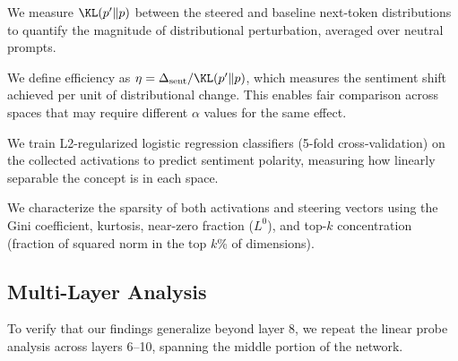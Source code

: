We measure $\KL(p' \| p)$ between the steered and baseline next-token distributions to quantify the magnitude of distributional perturbation, averaged over neutral prompts.

We define efficiency as $\eta = \Delta_{\text{sent}} / \KL(p' \| p)$, which measures the sentiment shift achieved per unit of distributional change. This enables fair comparison across spaces that may require different $\alpha$ values for the same effect.

We train L2-regularized logistic regression classifiers (5-fold cross-validation) on the collected activations to predict sentiment polarity, measuring how linearly separable the concept is in each space.

We characterize the sparsity of both activations and steering vectors using the Gini coefficient, kurtosis, near-zero fraction ($L^0$), and top-$k$ concentration (fraction of squared norm in the top $k$\% of dimensions).

\subsection{Multi-Layer Analysis}

To verify that our findings generalize beyond layer 8, we repeat the linear probe analysis across layers 6--10, spanning the middle portion of the network.
